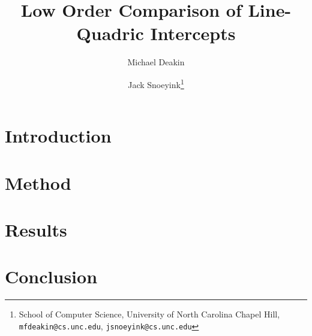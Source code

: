 \documentclass{cccg16}
\title{Low Order Comparison of Line-Quadric Intercepts}
\author{Michael Deakin \and
  Jack Snoeyink\thanks{School of Computer Science, University of North Carolina Chapel Hill, {\tt mfdeakin@cs.unc.edu}, {\tt jsnoeyink@cs.unc.edu}}}
\begin{document}
\thispagestyle{empty}
\maketitle

\begin{abstract}
\end{abstract}

\section{Introduction}
\section{Method}
\section{Results}
\section{Conclusion}
\end{document}
